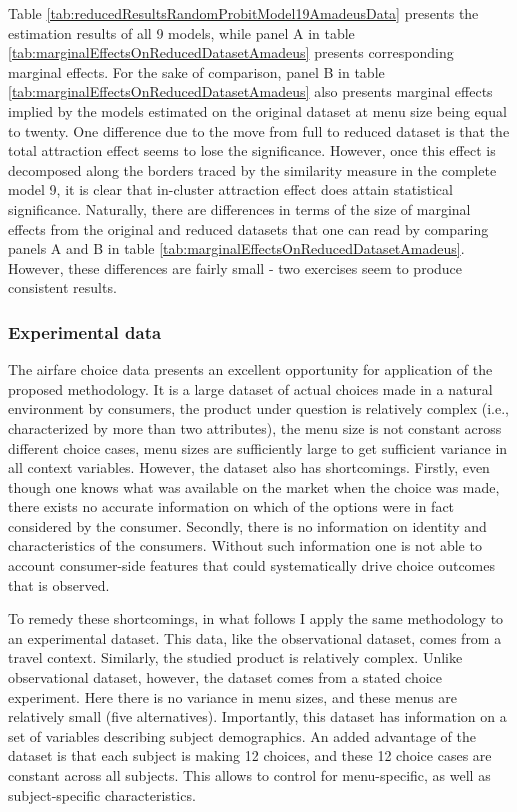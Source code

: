\documentclass[a4paper,12pt]{article}
\begin{document}
Table \ref{tab:reducedResultsRandomProbitModel19AmadeusData} presents the estimation results of all 9 models, while panel A in table \ref{tab:marginalEffectsOnReducedDatasetAmadeus} presents corresponding marginal effects. For the sake of comparison, panel B in table \ref{tab:marginalEffectsOnReducedDatasetAmadeus} also presents marginal effects implied by the models estimated on the original dataset at menu size being equal to twenty. One difference due to the move from full to reduced dataset is that the total attraction effect seems to lose the significance. However, once this effect is decomposed along the borders traced by the similarity measure in the complete model 9, it is clear that in-cluster attraction effect does attain statistical significance. Naturally, there are differences in terms of the size of marginal effects from the original and reduced datasets that one can read by comparing panels A and B in table \ref{tab:marginalEffectsOnReducedDatasetAmadeus}. However, these differences are fairly small - two exercises seem to produce consistent results.

\subsubsection{Experimental data}

The airfare choice data presents an excellent opportunity for application of the proposed methodology. It is a large dataset of actual choices made in a natural environment by consumers, the product under question is relatively complex (i.e., characterized by more than two attributes), the menu size is not constant across different choice cases, menu sizes are sufficiently large to get sufficient variance in all context variables. However, the dataset also has shortcomings. Firstly, even though one knows what was available on the market when the choice was made, there exists no accurate information on which of the options were in fact considered by the consumer. Secondly, there is no information on identity and characteristics of the consumers. Without such information one is not able to account consumer-side features that could systematically drive choice outcomes that is observed.

To remedy these shortcomings, in what follows I apply the same methodology to an experimental dataset. This data, like the observational dataset, comes from a travel context. Similarly, the studied product is relatively complex. Unlike observational dataset, however, the dataset comes from a stated choice experiment. Here there is no variance in menu sizes, and these menus are relatively small (five alternatives). Importantly, this dataset has information on a set of variables describing subject demographics. An added advantage of the dataset is that each subject is making 12 choices, and these 12 choice cases are constant across all subjects. This allows to control for menu-specific, as well as subject-specific characteristics.
\end{document}
